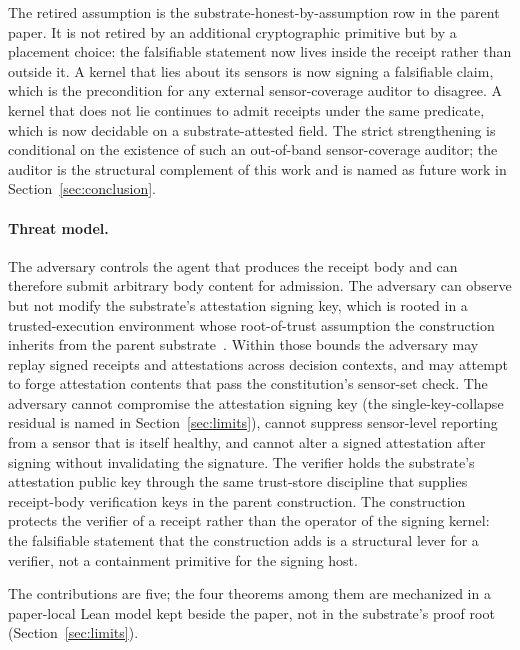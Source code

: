 The retired assumption is the substrate-honest-by-assumption row in the parent paper. It is not retired by an additional cryptographic primitive but by a placement choice: the falsifiable statement now lives inside the receipt rather than outside it. A kernel that lies about its sensors is now signing a falsifiable claim, which is the precondition for any external sensor-coverage auditor to disagree. A kernel that does not lie continues to admit receipts under the same predicate, which is now decidable on a substrate-attested field. The strict strengthening is conditional on the existence of such an out-of-band sensor-coverage auditor; the auditor is the structural complement of this work and is named as future work in Section~\ref{sec:conclusion}.

\paragraph{Threat model.}
The adversary controls the agent that produces the receipt body and can therefore submit arbitrary body content for admission. The adversary can observe but not modify the substrate's attestation signing key, which is rooted in a trusted-execution environment whose root-of-trust assumption the construction inherits from the parent substrate~\cite{chioProgrammableSovereignty2027}. Within those bounds the adversary may replay signed receipts and attestations across decision contexts, and may attempt to forge attestation contents that pass the constitution's sensor-set check. The adversary cannot compromise the attestation signing key (the single-key-collapse residual is named in Section~\ref{sec:limits}), cannot suppress sensor-level reporting from a sensor that is itself healthy, and cannot alter a signed attestation after signing without invalidating the signature. The verifier holds the substrate's attestation public key through the same trust-store discipline that supplies receipt-body verification keys in the parent construction. The construction protects the verifier of a receipt rather than the operator of the signing kernel: the falsifiable statement that the construction adds is a structural lever for a verifier, not a containment primitive for the signing host.

The contributions are five; the four theorems among them are mechanized in a paper-local Lean model kept beside the paper, not in the substrate's proof root (Section~\ref{sec:limits}).

